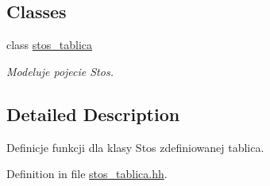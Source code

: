 \subsection*{Classes}
\begin{DoxyCompactItemize}
\item 
class \hyperlink{classstos__tablica}{stos\-\_\-tablica}
\begin{DoxyCompactList}\small\item\em Modeluje pojecie Stos. \end{DoxyCompactList}\end{DoxyCompactItemize}


\subsection{Detailed Description}
Definicje funkcji dla klasy Stos zdefiniowanej tablica. 

Definition in file \hyperlink{stos__tablica_8hh_source}{stos\-\_\-tablica.\-hh}.

